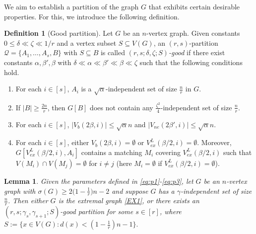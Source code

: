 \documentclass[11pt, a4paper]{article}
\newtheorem{lemma}[theorem]{Lemma}
\theoremstyle{definition}
\newtheorem{definition}[theorem]{Definition}
\newcommand{\<}{\subseteq}
\begin{document}
We aim to establish a partition of the graph $G$ that exhibits certain desirable properties. For this, we introduce the following definition.
\begin{definition}[Good partition]\label{Partition}
Let $G$ be an $n$-vertex graph. Given constants $0\le \delta\ll \zeta \ll 1/r$ and a vertex subset $S\subseteq V(G)$, an $(r,s)$-partition $\mathcal{Q}=\{A_1,\ldots,A_s,B\}$ with $S\subseteq B$ is called \textit{$(r,s;\delta, \zeta;S)$-good} if there exist constants $\alpha,
\beta',\beta$ with $\delta\ll \alpha \ll \beta' \ll \beta \ll \zeta$ such that the following conditions hold.
\begin{enumerate}
[label =\rm  (A\arabic{enumi})]
    \item\label{B1}  For each $i\in [s]$, $A_i$ is a $\sqrt{\alpha}$-independent set of size $\frac{n}{r}$ in $G$.
    \item\label{B2} If $|B| \ge \frac{2n}{r}$, then $G[B]$ does not contain any $\frac{\zeta^2}{4}$-independent set of size $\frac{n}{r}$. 
    \item\label{B3} For each $i\in [s]$, $|V_b(2\beta,i)|\le \sqrt{\alpha} n$ and $ |V_{ne}(2\beta',i)|\le \sqrt{\alpha} n$.
    \item\label{B4} For each $i\in [s]$, either $V_b(2\beta,i)=\emptyset$ or $V_{ex}^L(\beta/2,i)=\emptyset$. Moreover, $G[V_{ex}^L(\beta/2,i),A_i]$ contains a matching $M_i$ covering $V_{ex}^L(\beta/2,i)$ such that $V(M_i)\cap V(M_j)=\emptyset$ for $i\neq j$ %
    (here $M_i=\emptyset$ if $V_{ex}^L(\beta/2,i)=\emptyset$). %
\end{enumerate}
\end{definition}

\begin{lemma}\label{Lpartition}
     Given the parameters defined in \eqref{eq:p1}-\eqref{eq:p3}, let $G$ be an $n$-vertex graph with
$\sigma(G)\ge 2\big(1-\frac{1}{r}\big)n-2$ 
and suppose $G$ has a $\gamma$-independent set of size $\frac{n}{r}$. Then either $G$ is the extremal graph  \ref{EX1}, or there exists an $(r,s;\gamma_s,\gamma_{s+1};S)$-good partition for some $s\in[r]$, where $S:=\big\{x\in V(G):d(x)<(1-\frac{1}{r})n-1\big\}.$
\end{lemma}
\end{document}
